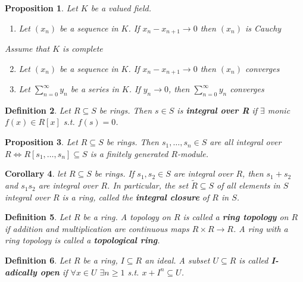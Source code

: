 \documentclass[a4paper]{article}
\newtheorem{definition}{Definition}
\newtheorem{prop}[definition]{Proposition}
\newtheorem{corollary}[definition]{Corollary}
\begin{document}
\begin{prop}
	Let $K$ be a valued field.
	\begin{enumerate}[label=\roman*.]
		\item Let $(x_n)$ be a sequence in $K$.
		If $x_n - x_{n+1} \to 0$ then $(x_n)$ is Cauchy
	\end{enumerate}
	Assume that $K$ is complete
	\begin{enumerate}[label=\roman*.]
		\setcounter{enumi}{1}
		\item Let $(x_n)$ be a sequence in $K$.
		If $x_n - x_{n+1} \to 0$ then $(x_n)$ converges
		\item Let $\sum_{n=0}^{\infty}y_n$ be a series in $K$.
		If $y_n\to0$, then $\sum_{n=0}^{\infty}y_n$ converges
	\end{enumerate}
\end{prop}

\begin{definition}
	Let $R \subseteq S$ be rings.
	Then $s \in S$ is \textbf{integral over R} if $\exists$ monic $f(x) \in R[x]$ s.t. $f(s)=0$.
\end{definition}

\begin{prop}
	Let $R \subseteq S$ be rings.
	Then $s_1, \dots,s_n\in S$ are all integral over $R \iff R[s_1,\dots,s_n] \subseteq S$ is a finitely generated $R$-module.
\end{prop}

\begin{corollary}
	let $R \subseteq S$ be rings.
	If $s_1, s_2 \in S$ are integral over $R$, then $s_1+s_2$ and $s_1s_2$ are integral over $R$.
	In particular, the set $\tilde{R}\subseteq S$ of all elements in $S$ integral over $R$ is a ring,
	called the \textbf{integral closure} of $R$ in $S$.
\end{corollary}

\begin{definition}
	Let $R$ be a ring. A topology on $R$ is called a \textbf{ring topology} on $R$ if addition and multiplication are continuous maps $R\times R\to R$. A ring with a ring topology is called a \textbf{topological ring}.
\end{definition}

\begin{definition}
	Let $R$ be a ring, $I \subseteq R$ an ideal. A subset $U \subseteq R$ is called \linebreak \textbf{I-adically open} if $\forall x \in U$ $\exists n \geq 1$ s.t. $x + I^n \subseteq U$.
\end{definition}
\end{document}
